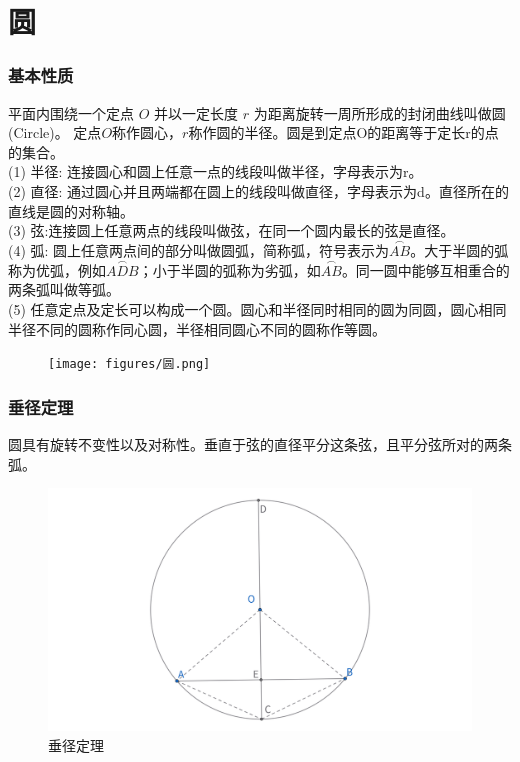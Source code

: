 \part{圆}
\section{基本性质}
\begin{definition}[圆]
    平面内围绕一个定点 $O$ 并以一定长度 $r$ 为距离旋转一周所形成的封闭曲线叫做圆(Circle)。
    \newline
    定点$O$称作圆心，$r$称作圆的半径。圆是到定点O的距离等于定长r的点的集合。\\
    (1) 半径: 连接圆心和圆上任意一点的线段叫做半径，字母表示为r。\\
    (2) 直径: 通过圆心并且两端都在圆上的线段叫做直径，字母表示为d。直径所在的直线是圆的对称轴。\\
    (3) 弦:连接圆上任意两点的线段叫做弦，在同一个圆内最长的弦是直径。\\
    (4) 弧: 圆上任意两点间的部分叫做圆弧，简称弧，符号表示为$\overset{\frown}{AB}$。大于半圆的弧称为优弧，例如$\overset{\frown}{ADB}$；小于半圆的弧称为劣弧，如$\overset{\frown}{AB}$。同一圆中能够互相重合的两条弧叫做等弧。\\
    (5) 任意定点及定长可以构成一个圆。圆心和半径同时相同的圆为同圆，圆心相同半径不同的圆称作同心圆，半径相同圆心不同的圆称作等圆。\\
\end{definition}

\begin{figure}[H]
    \centering
    \texttt{[image: figures/圆.png]}
\end{figure}


\newpage 
\section{垂径定理}
\begin{theorem}[垂径定理]
圆具有旋转不变性以及对称性。垂直于弦的直径平分这条弦，且平分弦所对的两条弧。
\end{theorem}
\begin{figure}[H]
    \centering
    \includegraphics[width=\linewidth]{figures/垂径定理.png}
    \caption{垂径定理}
\end{figure}


